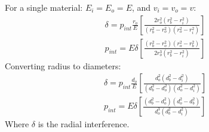 \documentclass[11pt]{article}
\numberwithin{equation}{section}
\begin{document}
For a single material: $E_i = E_o = E$, and $v_i = v_o = v$:
\begin{gather}
    \delta = p_{int} \frac{r_o}{E}\left[\frac{2r_o^2\left(r_b^2-r_i^2\right)}{\left(r_b^2 - r_o^2\right)\left(r_o^2-r_i^2\right)}\right] \\
    p_{int} = E \delta \left[\frac{\left(r_b^2 - r_o^2\right)\left(r_o^2 - r_b^2\right)}{2r_o^3\left(r_b^2 - r_i^2\right)}\right]
\end{gather}
Converting radius to diameters:
\begin{gather}
    \delta = p_{int} \frac{d_o}{E}\left[\frac{d_o^2\left(d_b^2-d_i^2\right)}{\left(d_b^2 - d_o^2\right)\left(d_o^2-d_i^2\right)}\right] \label{q2idelta}\\
    p_{int} = E \delta \left[\frac{\left(d_b^2 - d_o^2\right)\left(d_o^2 - d_b^2\right)}{d_o^3\left(d_b^2 - d_i^2\right)}\right]
\end{gather}
Where $\delta$ is the radial interference.
\end{document}
